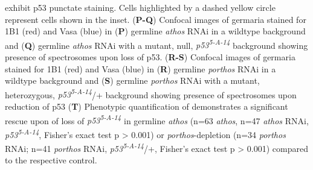 \documentclass[12pt,oneside]{reedthesis}
\begin{document}
exhibit p53 punctate staining. Cells highlighted by a dashed yellow
circle represent cells shown in the inset. (\textbf{P-Q}) Confocal images of
germaria stained for 1B1 (red) and Vasa (blue) in (\textbf{P}) germline
\emph{athos} RNAi in a wildtype background and (\textbf{Q}) germline \emph{athos} RNAi
with a mutant, null, \emph{p53\textsuperscript{5-A-14}} background showing presence of
spectrosomes upon loss of p53. (\textbf{R-S}) Confocal images of germaria
stained for 1B1 (red) and Vasa (blue) in (\textbf{R}) germline \emph{porthos} RNAi
in a wildtype background and (\textbf{S}) germline \emph{porthos} RNAi with a
mutant, heterozygous, \emph{p53\textsuperscript{5-A-14}}/+ background showing presence of
spectrosomes upon reduction of p53 (\textbf{T}) Phenotypic quantification of
demonstrates a significant rescue upon of loss of \emph{p53\textsuperscript{5-A-14}} in
germline \emph{athos} (n=63 \emph{athos}, n=47 \emph{athos} RNAi, \emph{p53\textsuperscript{5-A-14}},
Fisher's exact test p \textgreater{} 0.001) or \emph{porthos}-depletion (n=34 \emph{porthos}
RNAi; n=41 \emph{porthos} RNAi, \emph{p53\textsuperscript{5-A-14}}/+, Fisher's exact test p \textgreater{}
0.001) compared to the respective control.
\end{document}
